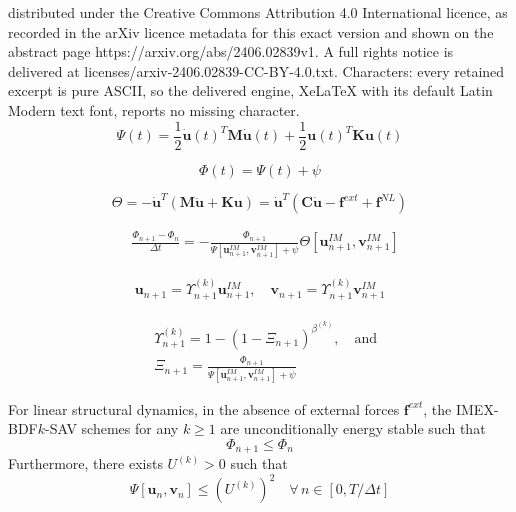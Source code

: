 \documentclass[10pt,a4paper]{amsart}
\begin{document}
distributed under the Creative Commons Attribution 4.0 International licence, as recorded in the arXiv licence metadata for this exact version and shown on the abstract page https://arxiv.org/abs/2406.02839v1. A full rights notice is delivered at licenses/arxiv-2406.02839-CC-BY-4.0.txt. Characters: every retained excerpt is pure ASCII, so the delivered engine, XeLaTeX with its default Latin Modern text font, reports no missing character.
\begin{equation}
    \Psi(t) = \frac{1}{2}\dot{\boldsymbol{u}}(t)^T\boldsymbol{M}\dot{\boldsymbol{u}}(t) + \frac{1}{2}\boldsymbol{u}(t)^T\boldsymbol{K}\boldsymbol{u}(t)
    \label{eqn:4thEnergy}
\end{equation}

\begin{equation}
    \Phi(t)=\Psi(t)+\psi
    \label{eqn:4thSAV_definition}
\end{equation}

\begin{equation}
    \Theta=-\dot{\boldsymbol{u}}^T \left( \boldsymbol{M}\ddot{\boldsymbol{u}} + \boldsymbol{K}\boldsymbol{u} \right)=\dot{\boldsymbol{u}}^T \left( \boldsymbol{C}\dot{\boldsymbol{u}}-\boldsymbol{f}^{ext}+\boldsymbol{f}^{NL} \right)
    \label{eqn:4thSAV_theta}
\end{equation}

\begin{align}
    & \frac{\Phi_{n+1}-\Phi_n}{\Delta t} = -\frac{\Phi_{n+1}}{\Psi[\boldsymbol{u}_{n+1}^{IM},\boldsymbol{v}_{n+1}^{IM}]+\psi}\Theta[\boldsymbol{u}_{n+1}^{IM},\boldsymbol{v}_{n+1}^{IM}] \label{eqn:4thBDFSAV}
\end{align}

\begin{align}
    \boldsymbol{u}_{n+1} = \Upsilon^{(k)}_{n+1} \boldsymbol{u}_{n+1}^{IM}, \quad \boldsymbol{v}_{n+1} = \Upsilon^{(k)}_{n+1} \boldsymbol{v}_{n+1}^{IM} \label{eqn:4thupdated}
\end{align}

\begin{align}
    & \Upsilon^{(k)}_{n+1}=1-(1-\Xi_{n+1})^{\beta^{(k)}},
    \quad \textrm{and} \label{eqn:4thupsilon} \\
    & \Xi_{n+1}=\frac{\Phi_{n+1}}{\Psi[\boldsymbol{u}_{n+1}^{IM},\boldsymbol{v}_{n+1}^{IM}]+\psi} \label{eqn:4thxi}
\end{align}

\begin{theorem}
    \label{theorem:4th1}
  For linear structural dynamics, in the absence of external forces $\boldsymbol{f}^{ext}$, the IMEX-BDF$k$-SAV schemes for any $k \ge 1$ are unconditionally energy stable such that
  \begin{equation}
      \Phi_{n+1} \le \Phi_n \label{eqn:4thLTheorem1}
  \end{equation}
  Furthermore, there exists $U^{(k)}>0$ such that
  \begin{equation}
      \Psi[\boldsymbol{u}_n,\boldsymbol{v}_n] \le \left(U^{(k)}\right)^2 \quad  \forall \, n \in [0, T/\Delta t] \label{eqn:4thLTheorem2}
  \end{equation}
\end{theorem}
\end{document}
